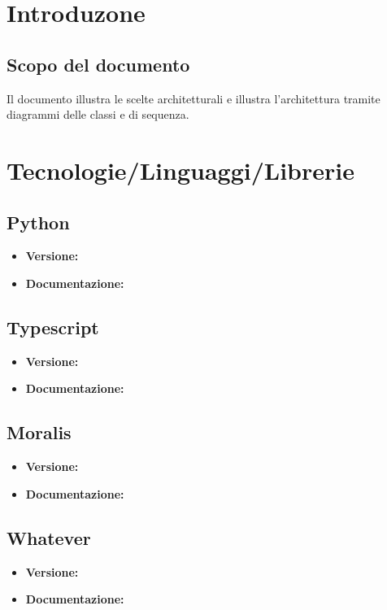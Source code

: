 \documentclass[a4paper, 12pt]{article}
\begin{document}
\makefrontpage

\makeversioni

\section{Introduzone}
\subsection{Scopo del documento}
Il documento illustra le scelte architetturali e illustra l'architettura tramite diagrammi delle classi e di sequenza.

\section{Tecnologie/Linguaggi/Librerie}
\subsection{Python}
\begin{itemize}
\item \textbf{Versione:}
\item \textbf{Documentazione:}
\end{itemize}

\subsection{Typescript}
\begin{itemize}
\item \textbf{Versione:}
\item \textbf{Documentazione:}
\end{itemize}

\subsection{Moralis}
\begin{itemize}
\item \textbf{Versione:}
\item \textbf{Documentazione:}
\end{itemize}

\subsection{Whatever}
\begin{itemize}
\item \textbf{Versione:}
\item \textbf{Documentazione:}
\end{itemize}
\end{document}
